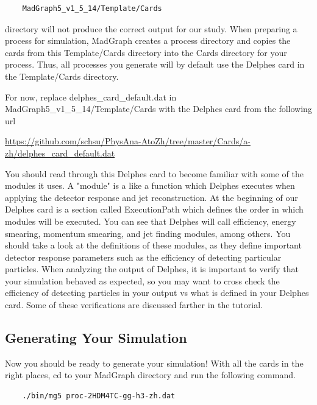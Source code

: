 \documentclass{article}
\begin{document}
\begin{verbatim}
	MadGraph5_v1_5_14/Template/Cards
\end{verbatim}

directory will not produce the correct output for our study. When preparing a process for
simulation, MadGraph creates a process directory and copies the cards from this Template/Cards
directory into the Cards directory for your process. Thus, all processes you generate will by
default use the Delphes card in the Template/Cards directory.

\bigskip

For now, replace delphes\_card\_default.dat in MadGraph5\_v1\_5\_14/Template/Cards with the Delphes card from the following url

\bigskip

\url{https://github.com/schsu/PhysAna-AtoZh/tree/master/Cards/a-zh/delphes_card_default.dat}

\bigskip

You should read through this Delphes card to become familiar with some of the modules it uses. A "module" is a like a function which Delphes executes
when applying the detector response and jet reconstruction. At the beginning of our Delphes card is a section called ExecutionPath which defines
the order in which modules will be executed. You can see that Delphes will call efficiency, energy smearing, momentum smearing, and jet finding modules,
among others. You should take a look at the definitions of these modules, as they define important detector response parameters such as the efficiency
of detecting particular particles. When analyzing the output of Delphes, it is important to verify that your simulation behaved as expected, so you may
want to cross check the efficiency of detecting particles in your output vs what is defined in your Delphes card. Some of these verifications are discussed
farther in the tutorial.

\subsection{Generating Your Simulation}

Now you should be ready to generate your simulation! With all the cards in the right places, cd to your MadGraph directory and run the following command.

\begin{verbatim}
	./bin/mg5 proc-2HDM4TC-gg-h3-zh.dat
\end{verbatim}
\end{document}
